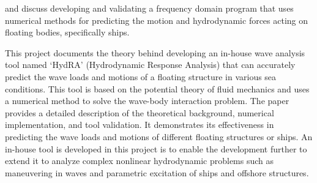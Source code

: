 \cite{guha2013development} and \cite{guha2015estimation} discuss developing and validating a frequency domain program that uses numerical methods for predicting the motion and hydrodynamic forces acting on floating bodies, specifically ships.


This project documents the theory behind developing an in-house wave analysis tool named `HydRA' (Hydrodynamic Response Analysis) that can accurately predict the wave loads and motions of a floating structure in various sea conditions. This tool is based on the potential theory of fluid mechanics and uses a numerical method to solve the wave-body interaction problem. The paper provides a detailed description of the theoretical background, numerical implementation, and tool validation. It demonstrates its effectiveness in predicting the wave loads and motions of different floating structures or ships. An in-house tool is developed in this project is to enable the development further to extend it to analyze complex nonlinear hydrodynamic problems such as maneuvering in waves and parametric excitation of ships and offshore structures. 
